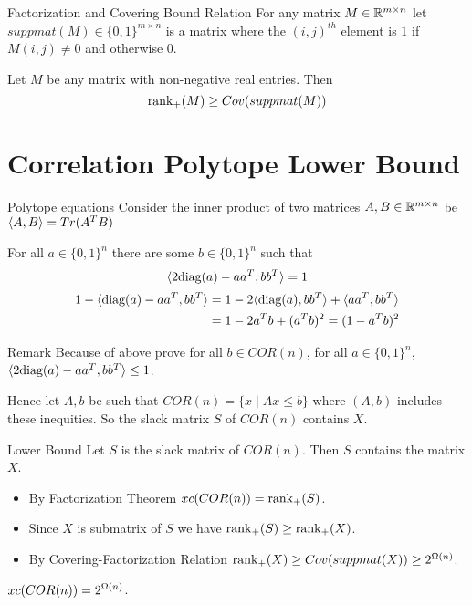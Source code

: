 \documentclass[aspectratio=1610]{beamer}
\begin{document}
\begin{frame}{Factorization and Covering Bound Relation}
	For any matrix $M\in\mathbb{R}^{m\times n}$ let $suppmat(M)\in\{0,1\}^{m\times n}$ is a matrix where the $(i,j)^{th}$ element is $1$ if $M(i,j)\neq 0$ and otherwise $0$.\vspace*{1cm}

	\begin{theorem}
		Let $M$ be any matrix with non-negative real entries. Then $$\operatorname{rank}_+(M)\geq Cov(suppmat(M))$$
	\end{theorem}
\end{frame}
\section{Correlation Polytope Lower Bound}
\begin{frame}{Polytope equations}
	Consider the inner product of two matrices $A,B\in\mathbb{R}^{m\times n}$ be $\langle A,B\rangle=Tr(A^TB)$\pause

	For all $a\in \{0,1\}^n$ there are some $b\in\{0,1\}^n$ such that $$\langle 2\text{diag}(a)-aa^T,bb^T\rangle=1$$ \begin{align*}
		1-\langle \text{diag}(a)-aa^T,bb^T\rangle & = 1-2\langle \text{diag}(a),bb^T\rangle+\langle aa^T,bb^T\rangle\\
		& = 1-2a^Tb+(a^Tb)^2=(1-a^Tb)^2
	\end{align*}\pause%

	\begin{tblock}{Remark}
		Because of above prove for all $b\in COR(n)$, for all $a\in\{0,1\}^n $, $\langle 2\text{diag}(a)-aa^T,bb^T\rangle\leq 1$. 
	\end{tblock}
	Hence let $A,b$ be such that $COR(n)=\{x\mid Ax\leq b\}$ where $(A,b)$ includes these inequities. So the slack matrix $S$ of $COR(n)$ contains $X$.
\end{frame}
\begin{frame}{Lower Bound}
	Let $S$ is the slack matrix of $COR(n)$. Then $S$ contains the matrix $X$. \vspace*{5mm}
	
	\begin{itemize}
		\item By Factorization Theorem $xc(COR(n))=\operatorname{rank}_+(S)$.\pause \vspace*{5mm}
		
		\item Since $X$ is submatrix of $S$ we have $\operatorname{rank}_+(S)\geq \operatorname{rank}_+(X)$.\pause\vspace*{5mm}
		
		
		\item By Covering-Factorization Relation $\operatorname{rank}_+(X)\geq Cov(suppmat(X))\geq 2^{\Omega(n)}$.
	\end{itemize}\vspace*{5mm}
		
	\begin{theorem}
		$xc(COR(n))=2^{\Omega(n)}$.
	\end{theorem}
\end{frame}
\end{document}
